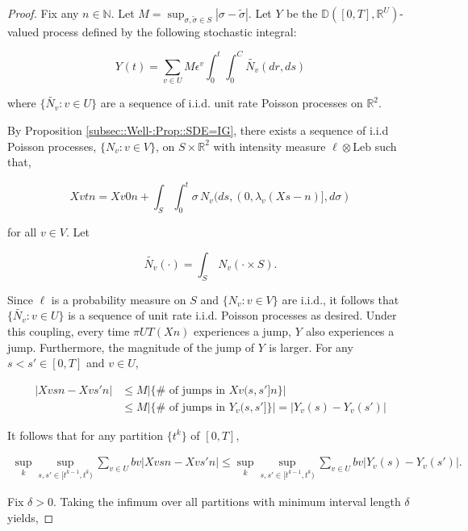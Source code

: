 \documentclass[12pt]{article}
\newcommand{\mb}{\mathbb}
\newcommand{\te}{\text}
\newcommand{\ep}{\epsilon}
\newcommand{\ind}{\hspace{24pt}}
\newcommand{\cad}{\mb{D}}							%
\renewcommand{\v}{v}							%
\renewcommand{\U}{U}							%
\renewcommand{\S}{S}							%
\newcommand{\s}{\sigma}							%
\renewcommand{\b}{b}							%
\newcommand{\ev}[1]{\ep^{#1}}					%
\newcommand{\T}{T}								%
\renewcommand{\t}{t}							%
\newcommand{\proj}{\pi}							%
\renewcommand{\tt}{s}							%
\newcommand{\ttt}{s'}							%
\newcommand{\X}{X}								%
\renewcommand{\ss}[1]{^{#1}}					%
\newcommand{\poiss}[1]{N_{#1}}						%
\newcommand{\leb}{\te{Leb}}							%
\newcommand{\pup}[1]{^{#1}}							%
\renewcommand{\ss}{\tilde{\s}}					%
\renewcommand{\r}{r}								%
\renewcommand{\it}{k}								%
\newcommand{\numb}{n}								%
\newcommand{\rxvtt}[2]{Y_{#1}{(#2)}}				%
\newcommand{\rxvtts}[2]{Y_{#1}{#2}}					%
\newcommand{\rate}[1]{\lambda_{#1}}					%
\newcommand{\const}[1]{C_{#1}}						%
\newcommand{\Sm}{\ell}								%
\newcommand{\alt}{\widetilde}						%
\begin{document}
\begin{proof}
Fix any \(\numb \in \mb{N}\). Let \(M = \sup_{\s,\ss \in \S} |\s - \ss|\). Let \(\rxvtts{}{}\) be the \(\cad([0,\T],\mb{R}^\U)\)-valued process defined by the following stochastic integral:

\[\rxvtt{}{\t} = \sum_{\v \in \U}M\ev{\v}\int_0^\t\int_0^{\const{}}\alt{\poiss{\v}}(d\r, d\tt)\]

where \(\{\alt{\poiss{\v}}:\v \in \U\}\) are a sequence of i.i.d. unit rate Poisson processes on \(\mb{R}^2\). 

\ind By Proposition \ref{subsec::Well-:Prop::SDE=IG}, there exists a sequence of i.i.d Poisson processes, \(\{\poiss{\v}:\v\in  V\}\), on \(\S\times\mb{R}^2\) with intensity measure \(\Sm\otimes \leb\) such that,

\[\X{\v}{\t}{\numb} = \X{\v}{0}{\numb} + \int_\S\int_0^\t \s\,\poiss{\v}(d\tt,(0,\rate{\v}(\X{}{\tt-}{\numb})],d\s)\]

for all \(\v\in  V\). Let

\[\alt{\poiss{\v}}(\cdot) = \int_\S\,\poiss{\v}(\cdot\times \S).\]

Since \(\Sm\) is a probability measure on \(\S\) and \(\{\poiss{\v}:\v\in  V\}\) are i.i.d., it follows that \(\{\alt{\poiss{\v}}:\v\in \U\}\) is a sequence of unit rate i.i.d. Poisson processes as desired. Under this coupling, every time \(\proj{\U}{\T}(\X{}{}{\numb})\) experiences a jump, \(\rxvtts{}{}\) also experiences a jump. Furthermore, the magnitude of the jump of \(\rxvtts{}{}\) is larger. For any \(\tt<\ttt\in [0,\T]\) and \(\v\in \U\),

\begin{align*}
|\X{\v}{\tt}{\numb} - \X{\v}{\ttt}{\numb}|&\leq M\left|\{\#\te{ of jumps in }\X{\v}{(\tt,\ttt]}{\numb}\}\right| \\
&\leq M\left|\{\#\te{ of jumps in }\rxvtts{\v}{(\tt,\ttt]}\}\right| = \left|\rxvtt{\v}{\tt} - \rxvtt{\v}{\ttt}\right|
\end{align*}

It follows that for any partition \(\{\t\pup{\it}\}\) of \([0,\T]\),

\begin{align*}
\sup_\it\sup_{\tt,\ttt \in [\t\pup{\it-1},\t\pup{\it})} \sum_{\v\in \U} \b{\v}|\X{\v}{\tt}{\numb} - \X{\v}{\ttt}{\numb}|\leq \sup_\it\sup_{\tt,\ttt \in [\t\pup{\it-1},\t\pup{\it})} \sum_{\v\in \U} \b{\v}|\rxvtt{\v}{\tt} - \rxvtt{\v}{\ttt}|.
\end{align*}

Fix \(\delta > 0\). Taking the infimum over all partitions with minimum interval length \(\delta\) yields,


\end{proof}
\end{document}
